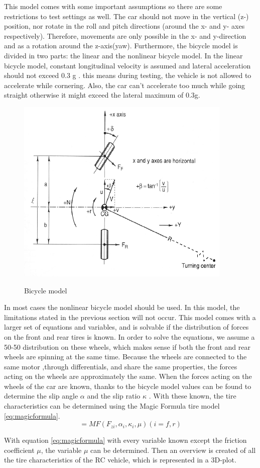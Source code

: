  This model comes with some important assumptions so there are some restrictions to test settings as well. The car should not move in the vertical (z-) position, nor rotate in the roll and pitch directions (around the x- and y- axes respectively). Therefore, movements are only possible in the x- and y-direction and as a rotation around the z-axis(yaw). 
Furthermore, the bicycle model is divided in two parts: the linear and the nonlinear bicycle model. In the linear bicycle model, constant longitudinal velocity is assumed and lateral acceleration should not exceed 0.3 g . this means during testing, the vehicle is not allowed to accelerate while cornering. Also, the car can't accelerate too much while going straight otherwise it might exceed the lateral maximum of 0.3g.
\begin{figure}
	\centering
		\includegraphics[scale=0.5]{figure/bicyclemodel.png}
	\label{fig:bicyclemodel}
	\caption{Bicycle model}
\end{figure}
In most cases the nonlinear bicycle model should be used. In this model, the limitations stated in the previous section will not occur. This model comes with a larger set of equations and variables, and is solvable if the distribution of forces on the front and rear tires is known. In order to solve the equations, we assume a 50-50 distribution on these wheels, which makes sense if both the front and rear wheels are spinning at the same time. Because the wheels are connected to the same motor ,through differentials, and share the same properties, the forces acting on the wheels are approximately the same.
When the forces acting on the wheels of the car are known, thanks to the bicycle model values can be found to determine the slip angle \( \alpha \)  and the slip ratio \(\kappa\) . With these known, the tire characteristics can be determined using the Magic Formula tire model \ref{eq:magicformula}. 
\begin{equation}
	[F_{xwi} ,F_{ywi}] = MF(F_{zi},\alpha_{i},\kappa_{i},\mu) (i = f,r)
	\label{eq:magicformula} 
\end{equation}


With equation \ref{eq:magicformula} with every variable known except the friction coefficient \(\mu\), the variable \(\mu\) can be determined. Then an overview is created of all the tire characteristics of the RC vehicle, which is represented in a 3D-plot.
